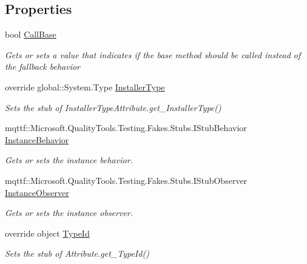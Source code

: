 \subsection*{Properties}
\begin{DoxyCompactItemize}
\item 
bool \hyperlink{class_system_1_1_component_model_1_1_fakes_1_1_stub_installer_type_attribute_acf821e5a73d1ffab6cd1e8f9064829c8}{Call\-Base}
\begin{DoxyCompactList}\small\item\em Gets or sets a value that indicates if the base method should be called instead of the fallback behavior\end{DoxyCompactList}\item 
override global\-::\-System.\-Type \hyperlink{class_system_1_1_component_model_1_1_fakes_1_1_stub_installer_type_attribute_a35931a3f78949e66714818c07d5d15b7}{Installer\-Type}
\begin{DoxyCompactList}\small\item\em Sets the stub of Installer\-Type\-Attribute.\-get\-\_\-\-Installer\-Type()\end{DoxyCompactList}\item 
mqttf\-::\-Microsoft.\-Quality\-Tools.\-Testing.\-Fakes.\-Stubs.\-I\-Stub\-Behavior \hyperlink{class_system_1_1_component_model_1_1_fakes_1_1_stub_installer_type_attribute_a2eb0747135ee6aa6f145861ff5ef7548}{Instance\-Behavior}
\begin{DoxyCompactList}\small\item\em Gets or sets the instance behavior.\end{DoxyCompactList}\item 
mqttf\-::\-Microsoft.\-Quality\-Tools.\-Testing.\-Fakes.\-Stubs.\-I\-Stub\-Observer \hyperlink{class_system_1_1_component_model_1_1_fakes_1_1_stub_installer_type_attribute_af55b6d16011c0322c7610b4b5536c3d5}{Instance\-Observer}
\begin{DoxyCompactList}\small\item\em Gets or sets the instance observer.\end{DoxyCompactList}\item 
override object \hyperlink{class_system_1_1_component_model_1_1_fakes_1_1_stub_installer_type_attribute_a31885cf1cf97a618fe53f626f508577f}{Type\-Id}
\begin{DoxyCompactList}\small\item\em Sets the stub of Attribute.\-get\-\_\-\-Type\-Id()\end{DoxyCompactList}\end{DoxyCompactItemize}


